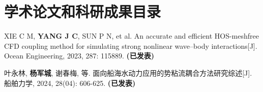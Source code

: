 \section*{学术论文和科研成果目录}
\label{sec:achievements}

\begin{enumerate}[label={[\arabic*]}]
  \item XIE C M, \textbf{YANG J C}, SUN P N, et al. %
  An accurate and efficient HOS-meshfree CFD coupling method for %
  simulating strong nonlinear wave–body interactions[J]. %
  Ocean Engineering, 2023, 287: 115889. \textbf{(已发表)}
  \item 叶永林, \textbf{杨军城}, 谢春梅, 等. %
  面向船海水动力应用的势粘流耦合方法研究综述[J]. %
  船舶力学, 2024, 28(04): 606-625. \textbf{(已发表)}
\end{enumerate}